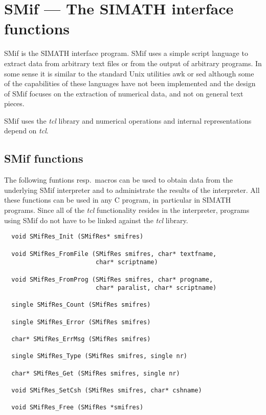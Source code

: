 \documentclass{article}
\begin{document}
\section{SMif --- The SIMATH interface functions}

SMif is the SIMATH interface program. SMif uses a simple script
language to extract data from arbitrary text files or from the output
of arbitrary programs. In some sense it is similar to the standard
Unix utilities awk or sed although some of the capabilities of these
languages have not been implemented and the design of SMif focuses on
the extraction of numerical data, and not on general text pieces.

SMif uses the \emph{tcl} library and numerical operations and internal
representations depend on \emph{tcl}.

\subsection{SMif functions}

The following funtions resp.\ macros can be used to obtain data from
the underlying SMif interpreter and to administrate the results of the
interpreter. All these functions can be used in any C program, in
particular in SIMATH programs. Since all of the \emph{tcl}
functionality resides in the interpreter, programs using SMif do not
have to be linked against the \emph{tcl} library.

\begin{verbatim}
  void SMifRes_Init (SMifRes* smifres)

  void SMifRes_FromFile (SMifRes smifres, char* textfname, 
                         char* scriptname)

  void SMifRes_FromProg (SMifRes smifres, char* progname,
                         char* paralist, char* scriptname)

  single SMifRes_Count (SMifRes smifres)

  single SMifRes_Error (SMifRes smifres)

  char* SMifRes_ErrMsg (SMifRes smifres)

  single SMifRes_Type (SMifRes smifres, single nr)

  char* SMifRes_Get (SMifRes smifres, single nr)

  void SMifRes_SetCsh (SMifRes smifres, char* cshname)

  void SMifRes_Free (SMifRes *smifres)
\end{verbatim}
\end{document}
